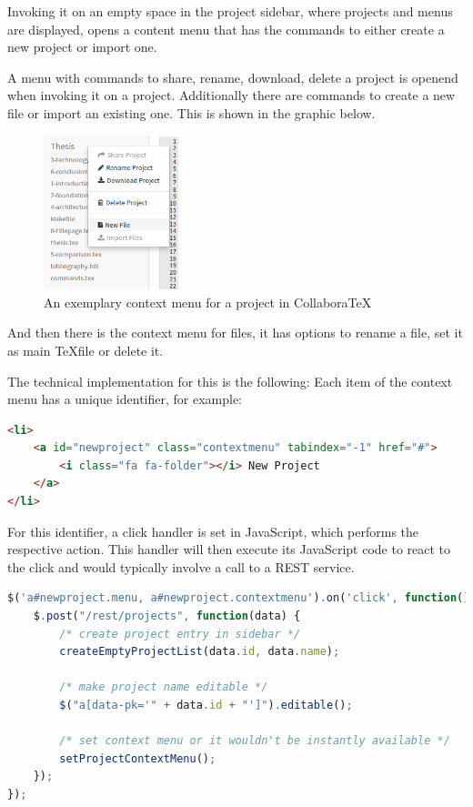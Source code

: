 Invoking it on an empty space in the project sidebar, where projects and menus are displayed, opens a content menu that has the commands to either create a new project or import one. 

A menu with commands to share, rename, download, delete a project is openend when invoking it on a project. Additionally there are commands to create a new file or import an existing one. This is shown in the graphic below.

\begin{figure}[H]
	\centering
		\includegraphics[width=0.35\textwidth]{images/screenshot-project-context-menu.png}
	\caption{An exemplary context menu for a project in CollaboraTeX}
\end{figure}

And then there is the context menu for files, it has options to rename a file, set it as main \TeX file or delete it.

The technical implementation for this is the following: Each item of the context menu has a unique identifier, for example:

\begin{lstlisting}[language=HTML, caption=Exemplary HTML Code for a Context Menu Item]
<li>
	<a id="newproject" class="contextmenu" tabindex="-1" href="#">
		<i class="fa fa-folder"></i> New Project
	</a>
</li>
\end{lstlisting}

For this identifier, a click handler is set in JavaScript, which performs the respective action. This handler will then execute its JavaScript code to react to the click and would typically involve a call to a REST service. \\

\begin{lstlisting}[language=JavaScript, caption=Exemplary Click Handler in JavaScript for a Context Menu Item]
$('a#newproject.menu, a#newproject.contextmenu').on('click', function() {
	$.post("/rest/projects", function(data) {
        /* create project entry in sidebar */
        createEmptyProjectList(data.id, data.name);

        /* make project name editable */
        $("a[data-pk='" + data.id + "']").editable();
        
        /* set context menu or it wouldn't be instantly available */
        setProjectContextMenu();
    });
});
\end{lstlisting}

